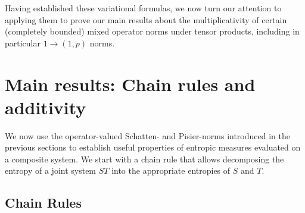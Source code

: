 \documentclass[11pt]{article}
\newcommand{\1}{\ensuremath{\mathbbm{1}}}
\theoremstyle{newdefinition}
\theoremstyle{newplain}
\newtheorem{remark}[definition]{Remark}
\theoremstyle{myplain}
\begin{document}



Having established these variational formulas, we now turn our attention to applying them to prove our main  results about the multiplicativity of certain (completely bounded) mixed operator norms under tensor products, including in particular $1\to (1,p)$ norms.


\section{Main results: Chain rules and additivity}\label{sec:Main.Results}

We now use the operator-valued Schatten- and Pisier-norms introduced in the previous sections to establish useful properties of entropic measures evaluated on a composite system. We start with a chain rule that allows decomposing the entropy of a joint system $ST$ into the appropriate entropies of $S$ and $T$. 

\subsection{Chain Rules}
\end{document}
